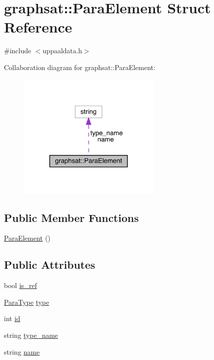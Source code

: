 \hypertarget{structgraphsat_1_1_para_element}{}\section{graphsat\+::Para\+Element Struct Reference}
\label{structgraphsat_1_1_para_element}


{\ttfamily \#include $<$uppaaldata.\+h$>$}



Collaboration diagram for graphsat\+::Para\+Element\+:
\nopagebreak
\begin{figure}[H]
\begin{center}
\leavevmode
\includegraphics[width=198pt]{structgraphsat_1_1_para_element__coll__graph}
\end{center}
\end{figure}
\subsection*{Public Member Functions}
\begin{DoxyCompactItemize}
\item 
\mbox{\hyperlink{structgraphsat_1_1_para_element_ad3ca6f7a65ddd44f6853819490e35f57}{Para\+Element}} ()
\end{DoxyCompactItemize}
\subsection*{Public Attributes}
\begin{DoxyCompactItemize}
\item 
bool \mbox{\hyperlink{structgraphsat_1_1_para_element_a38ec7e89f94d87560aac9f5530a638cf}{is\+\_\+ref}}
\item 
\mbox{\hyperlink{namespacegraphsat_abadbdfbf31432f83971eda936d4022f4}{Para\+Type}} \mbox{\hyperlink{structgraphsat_1_1_para_element_a85ae0f63397c6e54fab1f2e735a942ad}{type}}
\item 
int \mbox{\hyperlink{structgraphsat_1_1_para_element_af44ed1d2eb854e2eaa13e1469d56fbe0}{id}}
\item 
string \mbox{\hyperlink{structgraphsat_1_1_para_element_a577f8c019af46a3d7f923cb5c4a5a26d}{type\+\_\+name}}
\item 
string \mbox{\hyperlink{structgraphsat_1_1_para_element_a02e8169c16caa7f50d309c9f77f4db22}{name}}
\end{DoxyCompactItemize}


